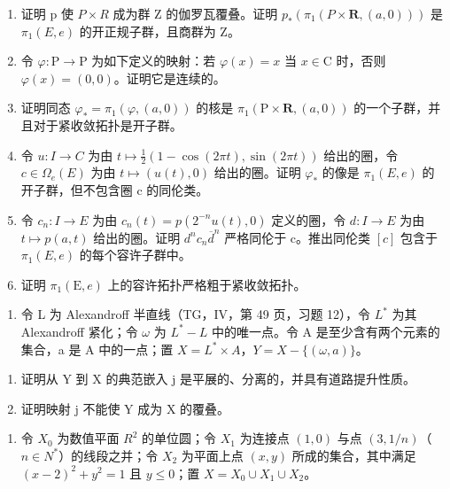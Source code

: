 \begin{enumerate}
\def\labelenumi{\alph{enumi})}
\item
  证明 p 使 \(P \times R\) 成为群 Z 的伽罗瓦覆叠。证明 \(p_{*}(\pi_{1}(P \times \mathbf{R}, (a,0)))\) 是 \(\pi_{1}(E, e)\) 的开正规子群，且商群为 Z。
\item
  令 \(\varphi\colon\mathrm{P}\to\mathrm{P}\) 为如下定义的映射：若 \(\varphi(x)=x\) 当 \(x\in\mathrm{C}\) 时，否则 \(\varphi(x)=(0,0)\)。证明它是连续的。
\item
  证明同态 \(\varphi_{*} = \pi_{1}(\varphi, (a,0))\) 的核是 \(\pi_{1}(\mathrm{P} \times \mathbf{R}, (a,0))\) 的一个子群，并且对于紧收敛拓扑是开子群。
\item
  令 \(u: I \to C\) 为由 \(t \mapsto \frac{1}{2}(1 - \cos(2\pi t), \sin(2\pi t))\) 给出的圈，令 \(c \in \Omega_e(E)\) 为由 \(t \mapsto (u(t), 0)\) 给出的圈。证明 \(\varphi_*\) 的像是 \(\pi_1(E, e)\) 的开子群，但不包含圈 c 的同伦类。
\item
  令 \(c_{n}: I \to E\) 为由 \(c_{n}(t) = p(2^{-n}u(t), 0)\) 定义的圈，令 \(d: I \to E\) 为由 \(t \mapsto p(a, t)\) 给出的圈。证明 \(d^{n}c_{n}\overline{d}^{n}\) 严格同伦于 c。推出同伦类 \([c]\) 包含于 \(\pi_{1}(E, e)\) 的每个容许子群中。
\item
  证明 \(\pi_{1}(\mathrm{E},e)\) 上的容许拓扑严格粗于紧收敛拓扑。
\end{enumerate}

\begin{enumerate}
\def\labelenumi{\arabic{enumi})}
\setcounter{enumi}{3}
\tightlist
\item
  令 L 为 Alexandroff 半直线（TG，IV，第 49 页，习题 12），令 \(L^{*}\) 为其 Alexandroff 紧化；令 \(\omega\) 为 \(L^{*} - L\) 中的唯一点。令 A 是至少含有两个元素的集合，a 是 A 中的一点；置 \(X = L^{*} \times A\)，\(Y = X - \{(\omega, a)\}\)。
\end{enumerate}

\begin{enumerate}
\def\labelenumi{\alph{enumi})}
\item
  证明从 Y 到 X 的典范嵌入 j 是平展的、分离的，并具有道路提升性质。
\item
  证明映射 j 不能使 Y 成为 X 的覆叠。
\end{enumerate}

\begin{enumerate}
\def\labelenumi{\arabic{enumi})}
\setcounter{enumi}{4}
\tightlist
\item
  令 \(X_{0}\) 为数值平面 \(R^{2}\) 的单位圆；令 \(X_{1}\) 为连接点 \((1,0)\) 与点 \((3,1/n)\)（\(n \in N^{*}\)）的线段之并；令 \(X_{2}\) 为平面上点 \((x,y)\) 所成的集合，其中满足 \((x-2)^{2} + y^{2} = 1\) 且 \(y \leqslant 0\)；置 \(X = X_{0} \cup X_{1} \cup X_{2}\)。
\end{enumerate}

